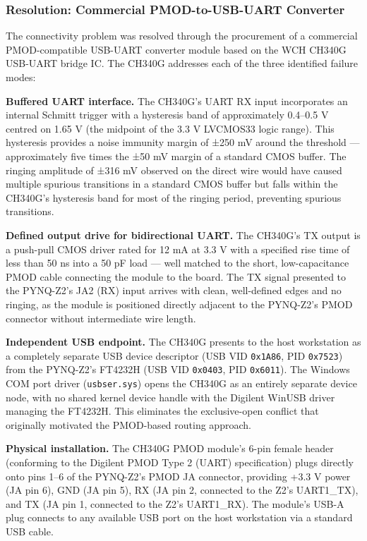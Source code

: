 \subsubsection{Resolution: Commercial PMOD-to-USB-UART Converter}

The connectivity problem was resolved through the procurement of a commercial PMOD-compatible USB-UART converter module based on the WCH CH340G USB-UART bridge IC. The CH340G addresses each of the three identified failure modes:

\textbf{Buffered UART interface.} The CH340G's UART RX input incorporates an internal Schmitt trigger with a hysteresis band of approximately 0.4–0.5 V centred on 1.65 V (the midpoint of the 3.3 V LVCMOS33 logic range). This hysteresis provides a noise immunity margin of ±250 mV around the threshold — approximately five times the ±50 mV margin of a standard CMOS buffer. The ringing amplitude of ±316 mV observed on the direct wire would have caused multiple spurious transitions in a standard CMOS buffer but falls within the CH340G's hysteresis band for most of the ringing period, preventing spurious transitions.

\textbf{Defined output drive for bidirectional UART.} The CH340G's TX output is a push-pull CMOS driver rated for 12 mA at 3.3 V with a specified rise time of less than 50 ns into a 50 pF load — well matched to the short, low-capacitance PMOD cable connecting the module to the board. The TX signal presented to the PYNQ-Z2's JA2 (RX) input arrives with clean, well-defined edges and no ringing, as the module is positioned directly adjacent to the PYNQ-Z2's PMOD connector without intermediate wire length.

\textbf{Independent USB endpoint.} The CH340G presents to the host workstation as a completely separate USB device descriptor (USB VID \texttt{0x1A86}, PID \texttt{0x7523}) from the PYNQ-Z2's FT4232H (USB VID \texttt{0x0403}, PID \texttt{0x6011}). The Windows COM port driver (\texttt{usbser.sys}) opens the CH340G as an entirely separate device node, with no shared kernel device handle with the Digilent WinUSB driver managing the FT4232H. This eliminates the exclusive-open conflict that originally motivated the PMOD-based routing approach.

\textbf{Physical installation.} The CH340G PMOD module's 6-pin female header (conforming to the Digilent PMOD Type 2 (UART) specification) plugs directly onto pins 1–6 of the PYNQ-Z2's PMOD JA connector, providing +3.3 V power (JA pin 6), GND (JA pin 5), RX (JA pin 2, connected to the Z2's UART1\_TX), and TX (JA pin 1, connected to the Z2's UART1\_RX). The module's USB-A plug connects to any available USB port on the host workstation via a standard USB cable.

